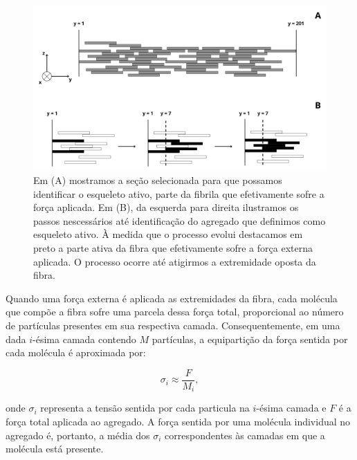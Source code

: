 \documentclass{report}
\begin{document}
        \begin{figure}[H]
            \centering
            \includegraphics[width=\textwidth]{figures/esqueleto.png}
    
            \caption{Em (A) mostramos a seção selecionada para que possamos identificar o esqueleto ativo, parte da fibrila
            que efetivamente sofre a força aplicada. Em (B), da esquerda para direita ilustramos os passos nescessários 
            até identificação do agregado que definimos como esqueleto ativo. À medida que o processo evolui destacamos 
            em preto a parte ativa da fibra que efetivamente sofre a força externa aplicada. O processo ocorre até 
            atigirmos a extremidade oposta da fibra.}  
    
            \label{M3}
        \end{figure}

        Quando uma força externa é aplicada as extremidades da fibra, cada molécula que compõe a fibra sofre uma parcela 
        dessa força total, proporcional ao número de partículas presentes em sua respectiva camada. Consequentemente, em 
        uma dada \(i\)-ésima camada contendo \(M\) partículas, a equipartição da força sentida por cada molécula é aproximada
         por:  

        \begin{equation}
            \sigma_{i} \approx \frac{F}{M_{i}},
        \end{equation}
            

        \noindent onde \(\sigma_{i}\) representa a tensão sentida por cada particula na \(i\)-ésima camada e \(F\) é a força 
        total aplicada ao agregado. A força sentida por uma molécula individual no agregado é, portanto, a média dos \(\sigma_{i}\) 
        correspondentes às camadas em que a molécula está presente. 
        
\end{document}

